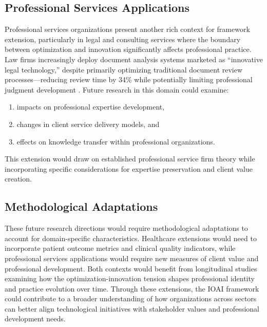 \subsection{Professional Services Applications}
Professional services organizations present another rich context for framework extension, particularly in legal and consulting services where the boundary between optimization and innovation significantly affects professional practice. Law firms increasingly deploy document analysis systems marketed as ``innovative legal technology,'' despite primarily optimizing traditional document review processes---reducing review time by 34\% while potentially limiting professional judgment development \parencite{kellogg2020}. Future research in this domain could examine:
\begin{enumerate}[label=(\arabic*)]
    \item impacts on professional expertise development,
    \item changes in client service delivery models, and
    \item effects on knowledge transfer within professional organizations.
\end{enumerate}
This extension would draw on established professional service firm theory while incorporating specific considerations for expertise preservation and client value creation.

\subsection{Methodological Adaptations}
These future research directions would require methodological adaptations to account for domain-specific characteristics. Healthcare extensions would need to incorporate patient outcome metrics and clinical quality indicators, while professional services applications would require new measures of client value and professional development. Both contexts would benefit from longitudinal studies examining how the optimization-innovation tension shapes professional identity and practice evolution over time. Through these extensions, the IOAI framework could contribute to a broader understanding of how organizations across sectors can better align technological initiatives with stakeholder values and professional development needs. 